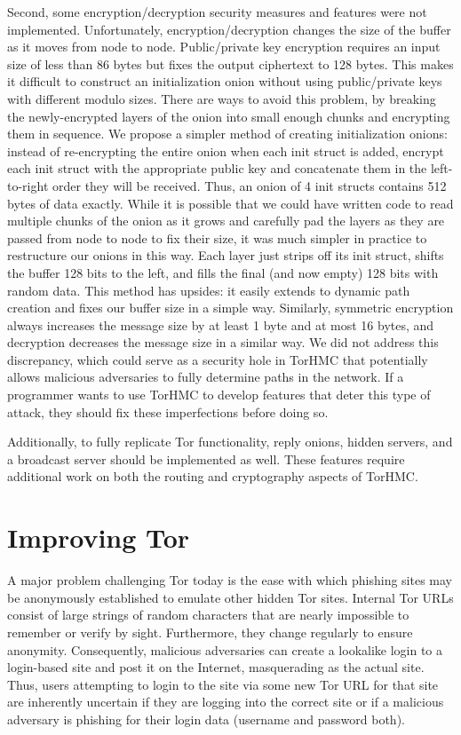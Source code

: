 \documentclass[12pt]{article}
\begin{document}
Second, some encryption/decryption security measures and features were not implemented. Unfortunately, encryption/decryption changes the size of the buffer as it moves from node to node. Public/private key encryption requires an input size of less than 86 bytes but fixes the output ciphertext to 128 bytes. This makes it difficult to construct an initialization onion without using public/private keys with different modulo sizes. There are ways to avoid this problem, by breaking the newly-encrypted layers of the onion into small enough chunks and encrypting them in sequence. We propose a simpler method of creating initialization onions: instead of re-encrypting the entire onion when each init struct is added, encrypt each init struct with the appropriate public key and concatenate them in the left-to-right order they will be received. Thus, an onion of 4 init structs contains 512 bytes of data exactly. While it is possible that we could have written code to read multiple chunks of the onion as it grows and carefully pad the layers as they are passed from node to node to fix their size, it was much simpler in practice to restructure our onions in this way. Each layer just strips off its init struct, shifts the buffer 128 bits to the left, and fills the final (and now empty) 128 bits with random data. This method has upsides: it easily extends to dynamic path creation and fixes our buffer size in a simple way. Similarly, symmetric encryption always increases the message size by at least 1 byte and at most 16 bytes, and decryption decreases the message size in a similar way. We did not address this discrepancy, which could serve as a security hole in TorHMC that potentially allows malicious adversaries to fully determine paths in the network. If a programmer wants to use TorHMC to develop features that deter this type of attack, they should fix these imperfections before doing so.

Additionally, to fully replicate Tor functionality, reply onions, hidden servers, and a broadcast server should be implemented as well. These features require additional work on both the routing and cryptography aspects of TorHMC. 

\section{Improving Tor}
A major problem challenging Tor today is the ease with which phishing sites may be anonymously established to emulate other hidden Tor sites. Internal Tor URLs consist of large strings of random characters that are nearly impossible to remember or verify by sight. Furthermore, they change regularly to ensure anonymity. Consequently, malicious adversaries can create a lookalike login to a login-based site and post it on the Internet, masquerading as the actual site. Thus, users attempting to login to the site via some new Tor URL for that site are inherently uncertain if they are logging into the correct site or if a malicious adversary is phishing for their login data (username and password both).
\end{document}
